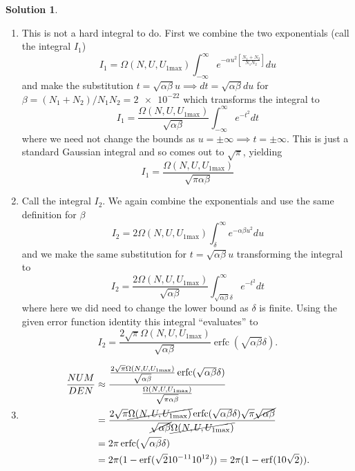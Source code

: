 \documentclass[10pt]{article}
\theoremstyle{definition}
\newtheorem{soln}{Solution}
\DeclareMathOperator{\erfc}{erfc}
\begin{document}
\begin{soln}~
  \begin{enumerate}[label=(\alph*)]
    \item This is not a hard integral to do. First we combine the two exponentials (call the integral $I_1$)
          $$I_1=\Omega(N,U,U_{1\text{max}})\int_{-\infty}^{\infty}e^{-\alpha u^2\left[\frac{N_1+N_2}{N_1N_2}\right]}du$$
          and make the substitution $t=\sqrt{\alpha \beta} u\implies dt=\sqrt{\alpha\beta}du$ for $\beta=(N_1+N_2)/N_1N_2=\num{2e-22}$
          which transforms the integral to
          $$I_1=\frac{\Omega(N,U,U_{1\text{max}})}{\sqrt{\alpha\beta}}\int_{-\infty}^{\infty}e^{-t^2}dt$$
          where we need not change the bounds as $u=\pm\infty\implies t=\pm \infty$. This is just a standard Gaussian integral and so comes out to
          $\sqrt{\pi}$, yielding
          $$I_1=\frac{\Omega(N,U,U_{1\text{max}})}{\sqrt{\pi\alpha\beta}}$$
    \item Call the integral $I_2$. We again combine the exponentials and use the same definition for $\beta$
          $$I_2= 2\Omega(N,U,U_{1\text{max}})\int_{\delta}^{\infty}e^{-\alpha\beta u^2}du$$
          and we make the same substitution for $t=\sqrt{\alpha\beta}u$ transforming the integral to
          $$I_2=\frac{2\Omega(N,U,U_{1\text{max}})}{\sqrt{\alpha\beta}}\int_{\sqrt{\alpha\beta}\delta}^{\infty}e^{-t^2}dt$$
          where here we did need to change the lower bound as $\delta$ is finite. Using the given error function identity this integral ``evaluates'' to
          $$I_2=\frac{2\sqrt{\pi}\Omega(N,U,U_{1\text{max}})}{\sqrt{\alpha\beta}}\erfc(\sqrt{\alpha\beta}\delta).$$
    \item
          \begin{align*}
            \frac{NUM}{DEN} & \approx\frac{\frac{2\sqrt{\pi}\Omega(N,U,U_{1\text{max}})}{\sqrt{\alpha\beta}}\erfc(\sqrt{\alpha\beta}\delta)}{\frac{\Omega(N,U,U_{1\text{max}})}{\sqrt{\pi\alpha\beta}}}                    \\
                            & =\frac{2\sqrt{\pi}\cancel{\Omega(N,U,U_{1\text{max}})}\erfc(\sqrt{\alpha\beta}\delta)\sqrt{\pi}\cancel{\sqrt{\alpha\beta}}}{\cancel{\sqrt{\alpha\beta}}\cancel{\Omega(N,U,U_{1\text{max}})}} \\
                            & =2\pi\erfc(\sqrt{\alpha\beta}\delta)                                                                                                                                                         \\
                            & =2\pi(1-\erf(\sqrt{2}10^{-11}10^{12}))=2\pi(1-\erf(10\sqrt{2})).

\end{align*}
\end{enumerate}
\end{soln}
\end{document}
